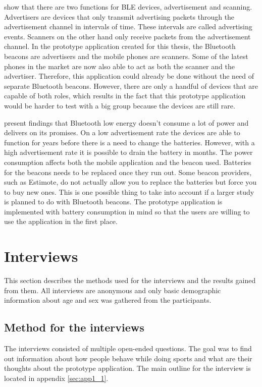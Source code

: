 \cite{bluetoothOverview} show that there are two functions for BLE devices, advertisement and scanning. Advertisers are devices that only transmit advertising packets through the advertisement channel in intervals of time. These intervals are called advertising events. Scanners on the other hand only receive packets from the advertisement channel. In the prototype application created for this thesis, the Bluetooth beacons are advertisers and the mobile phones are scanners. Some of the latest phones in the market are now also able to act as both the scanner and the advertiser. Therefore, this application could already be done without the need of separate Bluetooth beacons. However, there are only a handful of devices that are capable of both roles, which results in the fact that this prototype application would be harder to test with a big group because the devices are still rare.

\cite{bluetoothOverview} present findings that Bluetooth low energy doesn't consume a lot of power and delivers on its promises. On a low advertisement rate the devices are able to function for years before there is a need to change the batteries. However, with a high advertisement rate it is possible to drain the battery in months. The power consumption affects both the mobile application and the beacon used. Batteries for the beacons needs to be replaced once they run out. Some beacon providers, such as Estimote, do not actually allow you to replace the batteries but force you to buy new ones. This is one possible thing to take into account if a larger study is planned to do with Bluetooth beacons. The prototype application is implemented with battery consumption in mind so that the users are willing to use the application in the first place.
\clearpage

\section{Interviews}

This section describes the methods used for the interviews and the results gained from them. All interviews are anonymous and only basic demographic information about age and sex was gathered from the participants.

\subsection{Method for the interviews}

The interviews consisted of multiple open-ended questions. The goal was to find out information about how people behave while doing sports and what are their thoughts about the prototype application. The main outline for the interview is located in appendix \ref{sec:app1_1}.

